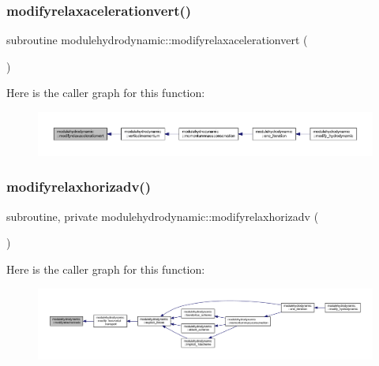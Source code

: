 \subsubsection{\texorpdfstring{modifyrelaxacelerationvert()}{modifyrelaxacelerationvert()}}
{\footnotesize\ttfamily subroutine modulehydrodynamic\+::modifyrelaxacelerationvert (\begin{DoxyParamCaption}{ }\end{DoxyParamCaption})\hspace{0.3cm}{\ttfamily [private]}}

Here is the caller graph for this function\+:\nopagebreak
\begin{figure}[H]
\begin{center}
\leavevmode
\includegraphics[width=350pt]{namespacemodulehydrodynamic_aabfea672c59bdb0df6fb5e5dc5a72b20_icgraph}
\end{center}
\end{figure}
\mbox{\label{namespacemodulehydrodynamic_aec4110455ce119ce9bcf22264816f780}} 
\subsubsection{\texorpdfstring{modifyrelaxhorizadv()}{modifyrelaxhorizadv()}}
{\footnotesize\ttfamily subroutine, private modulehydrodynamic\+::modifyrelaxhorizadv (\begin{DoxyParamCaption}{ }\end{DoxyParamCaption})\hspace{0.3cm}{\ttfamily [private]}}

Here is the caller graph for this function\+:\nopagebreak
\begin{figure}[H]
\begin{center}
\leavevmode
\includegraphics[width=350pt]{namespacemodulehydrodynamic_aec4110455ce119ce9bcf22264816f780_icgraph}
\end{center}
\end{figure}
\mbox{\label{namespacemodulehydrodynamic_ae798ddafe12ad94cd6148f8e2658f074}} 
